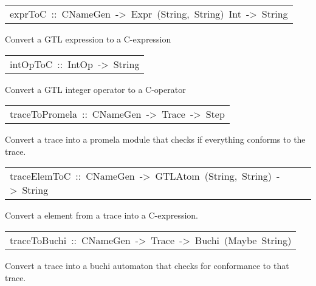 \begin{haddockdesc}
\item[\begin{tabular}{@{}l}
exprToC\ ::\ CNameGen\ ->\ Expr\ (String,\ String)\ Int\ ->\ String
\end{tabular}]\haddockbegindoc
Convert a GTL expression to a C-expression
\par

\end{haddockdesc}
\begin{haddockdesc}
\item[\begin{tabular}{@{}l}
intOpToC\ ::\ IntOp\ ->\ String
\end{tabular}]\haddockbegindoc
Convert a GTL integer operator to a C-operator
\par

\end{haddockdesc}
\begin{haddockdesc}
\item[\begin{tabular}{@{}l}
traceToPromela\ ::\ CNameGen\ ->\ Trace\ ->\ {\char 91}Step{\char 93}
\end{tabular}]\haddockbegindoc
Convert a trace into a promela module that checks if everything conforms to the trace.
\par

\end{haddockdesc}
\begin{haddockdesc}
\item[\begin{tabular}{@{}l}
traceElemToC\ ::\ CNameGen\ ->\ {\char 91}GTLAtom\ (String,\ String){\char 93}\ ->\ String
\end{tabular}]\haddockbegindoc
Convert a element from a trace into a C-expression.
\par

\end{haddockdesc}
\begin{haddockdesc}
\item[\begin{tabular}{@{}l}
traceToBuchi\ ::\ CNameGen\ ->\ Trace\ ->\ Buchi\ (Maybe\ String)
\end{tabular}]\haddockbegindoc
Convert a trace into a buchi automaton that checks for conformance to that trace.
\par

\end{haddockdesc}